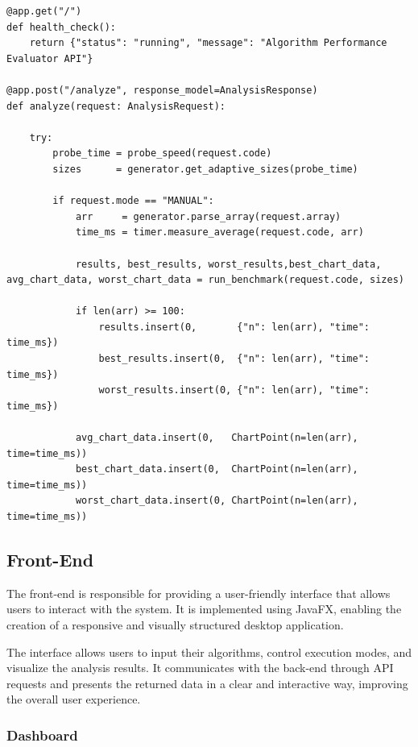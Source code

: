 \documentclass[12pt]{article}
\begin{document}
\begin{lstlisting}
@app.get("/")
def health_check():
    return {"status": "running", "message": "Algorithm Performance Evaluator API"}

@app.post("/analyze", response_model=AnalysisResponse)
def analyze(request: AnalysisRequest):

    try:
        probe_time = probe_speed(request.code)
        sizes      = generator.get_adaptive_sizes(probe_time)

        if request.mode == "MANUAL":
            arr     = generator.parse_array(request.array)
            time_ms = timer.measure_average(request.code, arr)

            results, best_results, worst_results,best_chart_data, avg_chart_data, worst_chart_data = run_benchmark(request.code, sizes)

            if len(arr) >= 100:
                results.insert(0,       {"n": len(arr), "time": time_ms})
                best_results.insert(0,  {"n": len(arr), "time": time_ms})
                worst_results.insert(0, {"n": len(arr), "time": time_ms})

            avg_chart_data.insert(0,   ChartPoint(n=len(arr), time=time_ms))
            best_chart_data.insert(0,  ChartPoint(n=len(arr), time=time_ms))
            worst_chart_data.insert(0, ChartPoint(n=len(arr), time=time_ms))
\end{lstlisting}

\newpage
\subsection{Front-End}

The front-end is responsible for providing a user-friendly interface that allows users to interact with the system. It is implemented using JavaFX, enabling the creation of a responsive and visually structured desktop application.

The interface allows users to input their algorithms, control execution modes, and visualize the analysis results. It communicates with the back-end through API requests and presents the returned data in a clear and interactive way, improving the overall user experience.

\vspace{0.5cm}
\subsubsection{Dashboard}
\end{document}
